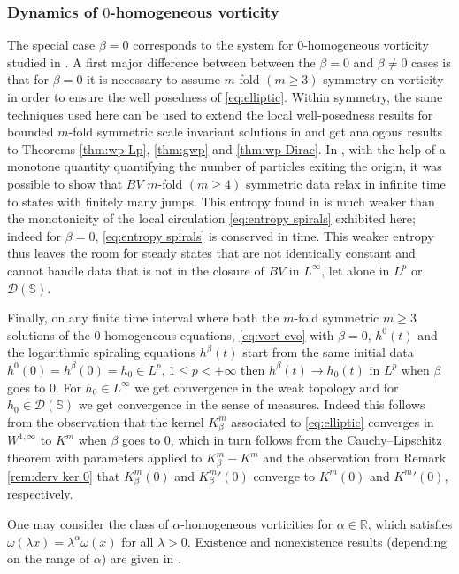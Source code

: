 \documentclass[JEP,XML,SOM,Unicode,NoFloatCountersInSection,published]{cedram}
\theoremstyle{plain}
\theoremstyle{definition}
\let\alp\alpha
\let\bt\beta
\let\lmb\lambda
\let\omg\omega
\newcommand{\bbR}{\mathbb R}
\begin{document}
\subsubsection*{Dynamics of $0$-homogeneous vorticity}
The special case $\bt=0$ corresponds to the system for $0$-homogeneous vorticity studied in \cite{EJ1,EMS}. A first major difference between between the $\bt=0$ and $\bt\neq 0$ cases is that for $\bt=0$ it is necessary to assume $m$\nobreakdash-fold $(m\geq 3)$ symmetry on vorticity in order to ensure the well posedness of \eqref{eq:elliptic}. Within symmetry, the same techniques used here can be used to extend the local well-posedness results for bounded $m$-fold symmetric scale invariant solutions in \cite{EJ1} and get analogous results to Theorems \ref{thm:wp-Lp}, \ref{thm:gwp} and \ref{thm:wp-Dirac}. In \cite{EMS}, with the help of a monotone quantity quantifying the number of particles exiting the origin, it was possible to show that $BV$ $m$-fold $(m\geq 4)$ symmetric data relax in infinite time to states with finitely many jumps. This entropy found in \cite{EMS} is much weaker than the monotonicity of the local circulation \eqref{eq:entropy spirals} exhibited here; indeed for $\beta=0$, \eqref{eq:entropy spirals} is conserved in time. This weaker entropy thus leaves the room for steady states that are not identically constant and cannot handle data that is not in the closure of $BV$ in $L^\infty$, let alone in $L^p$ or $\mathcal{D}(\mathbb{S})$.

Finally, on any finite time interval where both the $m$-fold symmetric $m\geq 3$ solutions of the $0$-homogeneous equations, \eqref{eq:vort-evo} with $\beta=0$, $h^0(t)$ and the logarithmic spiraling equations $h^\beta(t)$ start from the same initial data $h^0(0)=h^\beta(0)=h_0\in L^p$, $1 \leq p <+\infty$ then $h^\beta(t) \to h_0(t)$ in $L^p$ when $\beta$ goes to $0$. For $h_0 \in L^\infty$ we get convergence in the weak topology and for $h_0 \in \mathcal{D}(\mathbb{S})$ we get convergence in the sense of measures. Indeed this follows from the observation that the kernel $K_\beta^m$ associated to \eqref{eq:elliptic} converges in $W^{1,\infty}$ to $K^m$ when $\beta $ goes to 0, which in turn follows from the Cauchy--Lipschitz theorem with parameters applied to $K^m_\beta-K^m$ and the observation from Remark \ref{rem:derv ker 0} that $K_\beta^m(0)$ and ${K_\beta^m}'(0)$ converge to $K^m(0)$ and ${K^m}'(0)$, respectively.

One may consider the class of $\alpha$-homogeneous vorticities for $\alp\in \bbR$, which satisfies $\omg(\lmb x)= \lmb^\alp \omg(x)$ for all $\lmb>0$. Existence and nonexistence results (depending on the range of $\alp$) are given in \cite{Abe}.
\end{document}
